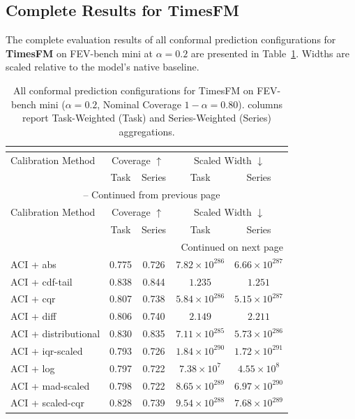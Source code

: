 \subsection{Complete Results for TimesFM}
The complete evaluation results of all conformal prediction configurations for \textbf{TimesFM} on FEV-bench mini at $\alpha=0.2$ are presented in Table~\ref{tab:all_results_timesfm}. Widths are scaled relative to the model's native baseline.

\begin{longtable}{lcccc}
	\caption{All conformal prediction configurations for TimesFM on FEV-bench mini ($\alpha=0.2$, Nominal Coverage $1-\alpha=0.80$). columns report Task-Weighted (Task) and Series-Weighted (Series) aggregations.}\\
	\label{tab:all_results_timesfm}\\
	\hline
	Calibration Method & \multicolumn{2}{c}{Coverage $\uparrow$} & \multicolumn{2}{c}{Scaled Width $\downarrow$} \\
 & Task & Series & Task & Series \\
	\hline
	\endfirsthead
	\multicolumn{5}{c}{\tablename\ \thetable\ -- Continued from previous page} \\
	\hline
	Calibration Method & \multicolumn{2}{c}{Coverage $\uparrow$} & \multicolumn{2}{c}{Scaled Width $\downarrow$} \\
 & Task & Series & Task & Series \\
	\hline
	\endhead
	\hline \multicolumn{5}{r}{{Continued on next page}} \\
	\endfoot
	\hline
	\endlastfoot
	ACI + abs & 0.775 & 0.726 & $7.82 \times 10^{286}$ & $6.66 \times 10^{287}$ \\
	ACI + cdf-tail & 0.838 & 0.844 & $1.235$ & $1.251$ \\
	ACI + cqr & 0.807 & 0.738 & $5.84 \times 10^{286}$ & $5.15 \times 10^{287}$ \\
	ACI + diff & 0.806 & 0.740 & $2.149$ & $2.211$ \\
	ACI + distributional & 0.830 & 0.835 & $7.11 \times 10^{285}$ & $5.73 \times 10^{286}$ \\
	ACI + iqr-scaled & 0.793 & 0.726 & $1.84 \times 10^{290}$ & $1.72 \times 10^{291}$ \\
	ACI + log & 0.797 & 0.722 & $7.38 \times 10^{7}$ & $4.55 \times 10^{8}$ \\
	ACI + mad-scaled & 0.798 & 0.722 & $8.65 \times 10^{289}$ & $6.97 \times 10^{290}$ \\
	ACI + scaled-cqr & 0.828 & 0.739 & $9.54 \times 10^{288}$ & $7.68 \times 10^{289}$ \\

\end{longtable}
